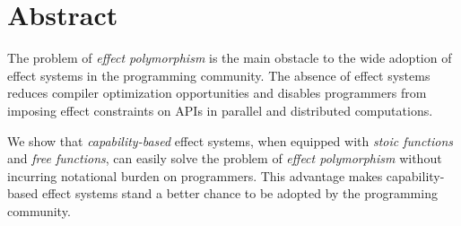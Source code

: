 \section*{\centering Abstract}

The problem of \emph{effect polymorphism} is the main obstacle to the
wide adoption of effect systems in the programming community. The
absence of effect systems reduces compiler optimization opportunities
and disables programmers from imposing effect constraints on APIs in
parallel and distributed computations.

We show that \emph{capability-based} effect systems, when equipped
with \emph{stoic functions} and \emph{free functions}, can easily
solve the problem of \emph{effect polymorphism} without incurring
notational burden on programmers. This advantage makes
capability-based effect systems stand a better chance to be adopted by
the programming community.
